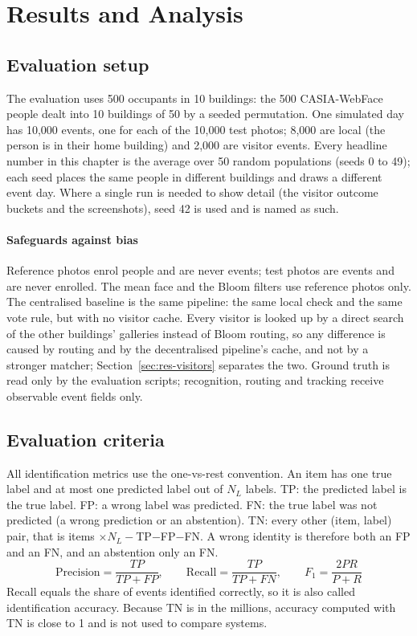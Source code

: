 \documentclass[12pt,a4paper,oneside]{report}
\begin{document}
\clearpage
\chapter{Results and Analysis}
\label{ch:results}
\section{Evaluation setup}
The evaluation uses 500 occupants in 10 buildings: the 500 CASIA-WebFace people dealt into 10 buildings of 50 by a seeded permutation. One simulated day has 10,000 events, one for each of the 10,000 test photos; 8,000 are local (the person is in their home building) and 2,000 are visitor events. Every headline number in this chapter is the average over 50 random populations (seeds 0 to 49); each seed places the same people in different buildings and draws a different event day. Where a single run is needed to show detail (the visitor outcome buckets and the screenshots), seed 42 is used and is named as such.

\subsubsection{Safeguards against bias}
Reference photos enrol people and are never events; test photos are events and are never enrolled. The mean face and the Bloom filters use reference photos only. The centralised baseline is the same pipeline: the same local check and the same vote rule, but with no visitor cache. Every visitor is looked up by a direct search of the other buildings' galleries instead of Bloom routing, so any difference is caused by routing and by the decentralised pipeline's cache, and not by a stronger matcher; Section~\ref{sec:res-visitors} separates the two. Ground truth is read only by the evaluation scripts; recognition, routing and tracking receive observable event fields only.

\section{Evaluation criteria}
All identification metrics use the one-vs-rest convention. An item has one true label and at most one predicted label out of $N_L$ labels. TP: the predicted label is the true label. FP: a wrong label was predicted. FN: the true label was not predicted (a wrong prediction or an abstention). TN: every other (item, label) pair, that is items $\times N_L-$TP$-$FP$-$FN. A wrong identity is therefore both an FP and an FN, and an abstention only an FN.
\begin{equation}\label{eq:metrics}
\mathrm{Precision}=\frac{TP}{TP+FP},\qquad \mathrm{Recall}=\frac{TP}{TP+FN},\qquad F_1=\frac{2PR}{P+R}
\end{equation}
Recall equals the share of events identified correctly, so it is also called identification accuracy. Because TN is in the millions, accuracy computed with TN is close to 1 and is not used to compare systems.
\end{document}
